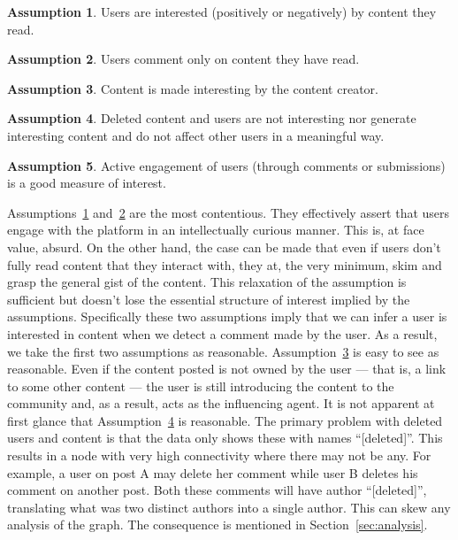 \documentclass[letterpaper, 10 pt, conference]{ieeeconf}
\theoremstyle{definition}
\newtheorem{assumption}{Assumption}[section]
\begin{document}
\begin{assumption}
  Users are interested (positively or negatively) by content they read.
  \label{assume:1}
\end{assumption} 

\begin{assumption}
  Users comment only on content they have read.
  \label{assume:2}
\end{assumption}

\begin{assumption}
  Content is made interesting by the content creator.
  \label{assume:3}
\end{assumption}

\begin{assumption}
  Deleted content and users are not interesting nor generate interesting content and do not affect other users in a meaningful way.
  \label{assume:4}
\end{assumption}

\begin{assumption}
  Active engagement of users (through comments or submissions) is a good measure of interest.
  \label{assume:5}
\end{assumption}

Assumptions~\ref{assume:1} and~\ref{assume:2} are the most contentious. They effectively assert that users engage with the platform in an intellectually curious manner. This is, at face value, absurd. On the other hand, the case can be made that even if users don't fully read content that they interact with, they at, the very minimum, skim and grasp the general gist of the content. This relaxation of the assumption is sufficient but doesn't lose the essential structure of interest implied by the assumptions. Specifically these two assumptions imply that we can infer a user is interested in content when we detect a comment made by the user. As a result, we take the first two assumptions as reasonable. Assumption~\ref{assume:3} is easy to see as reasonable. Even if the content posted is not owned by the user --- that is, a link to some other content --- the user is still introducing the content to the community and, as a result, acts as the influencing agent. It is not apparent at first glance that Assumption~\ref{assume:4} is reasonable. The primary problem with deleted users and content is that the data only shows these with names ``[deleted]''. This results in a node with very high connectivity where there may not be any. For example, a user on post A may delete her comment while user B deletes his comment on another post. Both these comments will have author ``[deleted]'', translating what was two distinct authors into a single author. This can skew any analysis of the graph. The consequence is mentioned in Section~\ref{sec:analysis}. 
\end{document}
